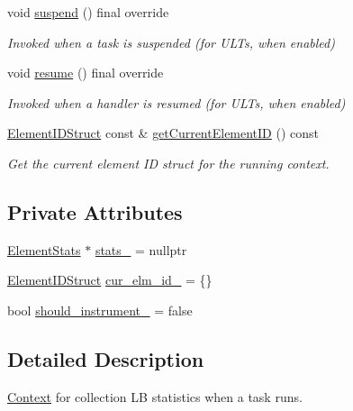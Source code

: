 \begin{DoxyCompactItemize}
void \hyperlink{structvt_1_1ctx_1_1_l_b_stats_a15d4c77ea06465f8e3a0b51c90bc6ddc}{suspend} () final override
\begin{DoxyCompactList}\small\item\em Invoked when a task is suspended (for U\+L\+Ts, when enabled) \end{DoxyCompactList}\item 
void \hyperlink{structvt_1_1ctx_1_1_l_b_stats_a099850f1bd53aafe650ed9e3958ca54b}{resume} () final override
\begin{DoxyCompactList}\small\item\em Invoked when a handler is resumed (for U\+L\+Ts, when enabled) \end{DoxyCompactList}\item 
\hyperlink{structvt_1_1ctx_1_1_l_b_stats_a9806d27212bffbbac72eb1e05f9e9880}{Element\+I\+D\+Struct} const  \& \hyperlink{structvt_1_1ctx_1_1_l_b_stats_acfcb5bb3b554fa1992525ec04d46b69e}{get\+Current\+Element\+ID} () const
\begin{DoxyCompactList}\small\item\em Get the current element ID struct for the running context. \end{DoxyCompactList}\end{DoxyCompactItemize}
\subsection*{Private Attributes}
\begin{DoxyCompactItemize}
\item 
\hyperlink{structvt_1_1ctx_1_1_l_b_stats_aaf24fff3db7252f70df0a02e12966eb4}{Element\+Stats} $\ast$ \hyperlink{structvt_1_1ctx_1_1_l_b_stats_a3cbfd8600aa3ba4284e3d2a6c4c7f07a}{stats\+\_\+} = nullptr
\item 
\hyperlink{structvt_1_1ctx_1_1_l_b_stats_a9806d27212bffbbac72eb1e05f9e9880}{Element\+I\+D\+Struct} \hyperlink{structvt_1_1ctx_1_1_l_b_stats_a54123d2d08b4dae9568a04697d400db7}{cur\+\_\+elm\+\_\+id\+\_\+} = \{\}
\item 
bool \hyperlink{structvt_1_1ctx_1_1_l_b_stats_ace63b8b294d303b5055a78a07ede6f5c}{should\+\_\+instrument\+\_\+} = false
\end{DoxyCompactItemize}


\subsection{Detailed Description}
\hyperlink{structvt_1_1ctx_1_1_context}{Context} for collection LB statistics when a task runs. 


